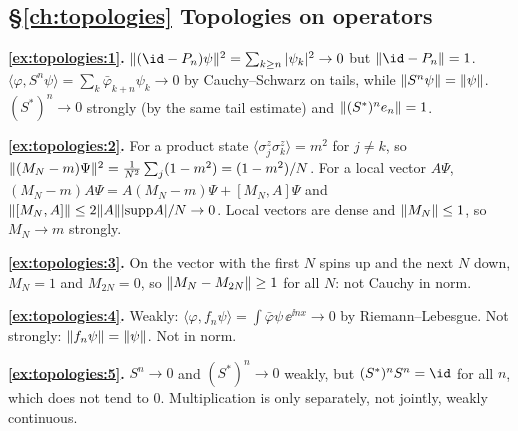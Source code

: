 {\subsection*{\S\ref{ch:topologies} Topologies on operators}
\textbf{\ref{ex:topologies:1}.} $\norm{(\id-P_n)\psi}^2=\sum_{k\ge n}|\psi_k|^2\to0$ but $\norm{\id-P_n}=1$. $\langle\varphi,S^n\psi\rangle=\sum_k\bar\varphi_{k+n}\psi_k\to0$ by Cauchy--Schwarz on tails, while $\lVert S^n\psi\rVert=\lVert \psi\rVert$. $(S^*)^n\to0$ strongly (by the same tail estimate) and $\lVert (S^*)^ne_n\rVert=1$.\par
\textbf{\ref{ex:topologies:2}.} For a product state $\langle\sigma^z_j\sigma^z_k\rangle=m^2$ for $j\ne k$, so $\lVert (M_N-m)\Psi\rVert^2=\frac1{N^2}\sum_j(1-m^2)=(1-m^2)/N$. For a local vector $A\Psi$, $(M_N-m)A\Psi=A(M_N-m)\Psi+[M_N,A]\Psi$ and $\lVert [M_N,A]\rVert\le2\lVert A\rVert|\mathrm{supp}A|/N\to0$. Local vectors are dense and $\lVert M_N\rVert\le1$, so $M_N\to m$ strongly.\par
\textbf{\ref{ex:topologies:3}.} On the vector with the first $N$ spins up and the next $N$ down, $M_N=1$ and $M_{2N}=0$, so $\lVert M_N-M_{2N}\rVert\ge1$ for all $N$: not Cauchy in norm.\par
\textbf{\ref{ex:topologies:4}.} Weakly: $\langle\varphi,f_n\psi\rangle=\int\bar\varphi\psi\,\ee^{\ii nx}\to0$ by Riemann--Lebesgue. Not strongly: $\lVert f_n\psi\rVert=\lVert \psi\rVert$. Not in norm.\par
\textbf{\ref{ex:topologies:5}.} $S^n\to0$ and $(S^*)^n\to0$ weakly, but $(S^*)^nS^n=\id$ for all $n$, which does not tend to $0$. Multiplication is only separately, not jointly, weakly continuous.\par

}
